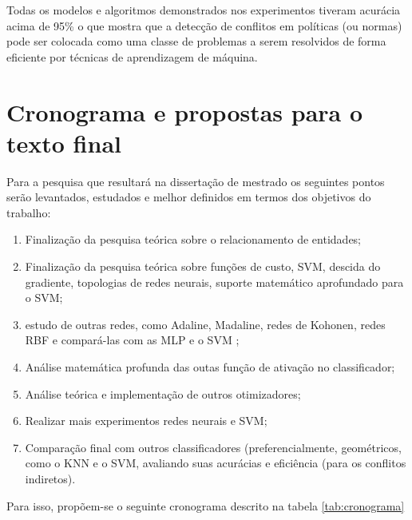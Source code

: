 Todas os modelos e algoritmos demonstrados nos experimentos tiveram acurácia acima de 95\% o que mostra que a detecção de conflitos em políticas (ou normas) pode ser colocada como uma classe de problemas a serem resolvidos de forma eficiente por técnicas de aprendizagem de máquina.

\chapter{Cronograma e propostas para o texto final}\label{propostas}
Para a pesquisa que resultará na dissertação de mestrado os seguintes pontos serão levantados, estudados e melhor definidos em termos dos objetivos do trabalho:
\begin{enumerate}
\item Finalização da pesquisa teórica sobre o relacionamento de entidades;
\item Finalização da pesquisa teórica sobre funções de custo, SVM, descida do gradiente, topologias de redes neurais, suporte matemático aprofundado para o SVM;
\item estudo de outras redes, como Adaline, Madaline, redes de Kohonen, redes RBF e compará-las com as MLP e o SVM ;
\item Análise matemática profunda das outas função de ativação no classificador;
\item Análise teórica e implementação de outros otimizadores;
\item Realizar mais experimentos redes neurais e SVM;
\item Comparação final com outros classificadores (preferencialmente, geométricos, como o KNN e o SVM, avaliando suas acurácias e eficiência (para os conflitos indiretos).
\end{enumerate}
Para isso, propõem-se o seguinte cronograma descrito na tabela \ref{tab:cronograma}


